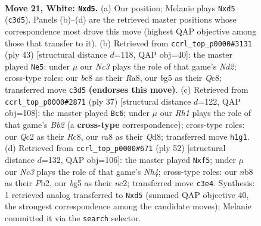 \documentclass[11pt]{article}
\begin{document}
\clearpage

\begin{figure}[p]\centering
\begin{subfigure}{0.46\textwidth}\centering
\resizebox{\linewidth}{!}{%
\newchessgame
\chessboard[
  setfen={rnbq4/pp4kp/4r2p/1P1p2b1/3P2P1/2N1PP2/2QKN3/R4B1R w - - 1 21},
  showmover=false,
  pgfstyle=straightmove, color=movearrow, markmove={c3-d5}
]}
\caption{}
\end{subfigure}\hfill
\begin{subfigure}{0.46\textwidth}\centering
\resizebox{\linewidth}{!}{%
\newchessgame
\chessboard[
  setfen={r1q1kn1r/pp1npp2/3p2p1/6P1/2P4P/1PQ1B2R/P7/2KR1B2 b kq - 0 22},
  showmover=false,
  pgfstyle=straightmove, color=movearrow, markmove={d7-e5}
]}
\caption{}
\end{subfigure}
\\[4pt]
\begin{subfigure}{0.46\textwidth}\centering
\resizebox{\linewidth}{!}{%
\newchessgame
\chessboard[
  setfen={2rqkb1r/1b1n1pp1/3pp2p/1N2n3/4P1P1/PP2BP1R/2PQB2P/1K1R4 b k - 3 19},
  showmover=false,
  pgfstyle=straightmove, color=movearrow, markmove={b7-c6}
]}
\caption{}
\end{subfigure}\hfill
\begin{subfigure}{0.46\textwidth}\centering
\resizebox{\linewidth}{!}{%
\newchessgame
\chessboard[
  setfen={3r1qbk/ppn1p2p/2p4b/4Pp2/P1pP1P1N/2N3RQ/1PnBBK1P/8 w - - 18 27},
  showmover=false,
  pgfstyle=straightmove, color=movearrow, markmove={h4-f5}
]}
\caption{}
\end{subfigure}
\caption{\textbf{Move 21, White: \texttt{Nxd5}.} (a) Our position; Melanie plays \texttt{Nxd5} (\texttt{c3d5}). Panels (b)--(d) are the retrieved master positions whose correspondence most drove this move (highest QAP objective among those that transfer to it). (b) Retrieved from \texttt{ccrl\_top\_p0000\#3131} (ply 43) [structural distance $d$=118, QAP obj=40]: the master played \texttt{Ne5}; under $\mu$ our \emph{Nc3} plays the role of that game's \emph{Nd2}; cross-type roles: our \emph{b}c8 as their \emph{R}a8, our \emph{b}g5 as their \emph{Q}c8; transferred move \texttt{c3d5} \textbf{(endorses this move)}. (c) Retrieved from \texttt{ccrl\_top\_p0000\#2871} (ply 37) [structural distance $d$=122, QAP obj=108]: the master played \texttt{Bc6}; under $\mu$ our \emph{Rh1} plays the role of that game's \emph{Bb2} (a \textbf{cross-type} correspondence); cross-type roles: our \emph{Q}c2 as their \emph{R}c8, our \emph{r}a8 as their \emph{Q}d8; transferred move \texttt{h1g1}. (d) Retrieved from \texttt{ccrl\_top\_p0000\#671} (ply 52) [structural distance $d$=132, QAP obj=106]: the master played \texttt{Nxf5}; under $\mu$ our \emph{Nc3} plays the role of that game's \emph{Nh4}; cross-type roles: our \emph{n}b8 as their \emph{P}b2, our \emph{b}g5 as their \emph{n}c2; transferred move \texttt{c3e4}. Synthesis: 1 retrieved analog transferred to \texttt{Nxd5} (summed QAP objective 40, the strongest correspondence among the candidate moves); Melanie committed it via the \texttt{search} selector.}
\label{fig:thought-m40}
\end{figure}
\end{document}
